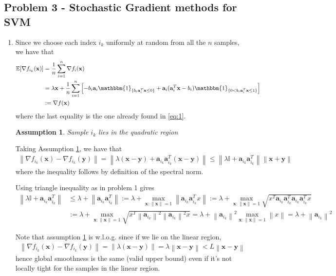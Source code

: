 \documentclass[letterpaper]{article}
\renewcommand{\aa}{\mathbf{a}}
\providecommand{\xx}{\mathbf{x}}
\providecommand{\yy}{\mathbf{y}}
\providecommand{\1}{\mathbf{1}}
\providecommand{\0}{\mathbf{0}}
\providecommand{\norm}[1]{\ensuremath{\left\lVert#1\right\rVert}}
\newtheorem{assumption}{Assumption}
\newcommand{\E}{\mathbb{E}}
\begin{document}
\subsection*{Problem 3 - Stochastic Gradient methods for SVM}
\begin{enumerate}[label=(\alph*)]
    \item
    Since we choose each index $i_k$ uniformly at random from all the $n$ samples, we have that
    \begin{align}
        \E[\nabla f_{i_k}(\xx)] &= \frac{1}{n} \sum_{i=1}^{n} \nabla f_i(\xx) \\
        &= \lambda \xx + \frac{1}{n}\sum_{i=1}^n \left[ -b_i \aa_i\mathbbm{1}_{\{b_i \aa_i^T \xx  \leq 0\}} + \aa _i(\aa_i^T \xx - b_i )\mathbbm{1}_{\{0<b_i \aa_i^T \xx\leq 1\}} \right] \\
        &:= \nabla f(\xx)
    \end{align}
    where the last equality is the one already found in \eqref{eq:1}.
    
    \begin{assumption}
        Sample $i_k$ lies in the quadratic region
        \label{as:1}
    \end{assumption}
    
    Taking Assumption \ref{as:1}, we have that
    \begin{align}
        \norm{\nabla f_{i_k}(\xx) - \nabla f_{i_k}(\yy)} = \norm{\lambda(\xx - \yy) + \aa_{i_k} \aa_{i_k}^T (\xx - \yy)} \leq \norm{\lambda\mathbb{I} + \aa_{i_k} \aa_{i_k}^T}\norm{\xx + \yy}
    \end{align}
    where the inequality follows by definition of the spectral norm.
    
    Using triangle inequality as in problem 1 gives
    \begin{align}
        \norm{\lambda\mathbb{I} + \aa_{i_k} \aa_{i_k}^T} &\leq \lambda + \norm{\aa_{i_k} \aa_{i_k}^T} := \lambda + \max_{\xx:\norm{\xx}=1} \norm{\aa_{i_k} \aa_{i_k}^T x} := \lambda + \max_{\xx:\norm{\xx}=1} \sqrt{x^T \aa_{i_k} \aa_{i_k} ^T \aa_{i_k} \aa_{i_k}^T x} \\
        &:=\lambda + \max_{\xx:\norm{\xx}=1} \sqrt{x^T \norm{\aa_{i_k}} ^2 \norm{\aa_{i_k}} ^2 x} = \lambda + \norm{\aa_{i_k}} ^2 \max_{\xx:\norm{\xx}=1} \norm{x} = \lambda + \norm{\aa_{i_k}} ^2
    \end{align}
    
    Note that assumption \ref{as:1} is w.l.o.g. since if we lie on the linear region,
    \begin{align}
        \norm{\nabla f_{i_k}(\xx) - \nabla f_{i_k}(\yy)} = \norm{\lambda(\xx - \yy)} = \lambda \norm{\xx-\yy} < L\norm{\xx-\yy}
    \end{align}
    hence global smoothness is the same (valid upper bound) even if it's not locally tight for the samples in the linear region.
    

\end{enumerate}
\end{document}
